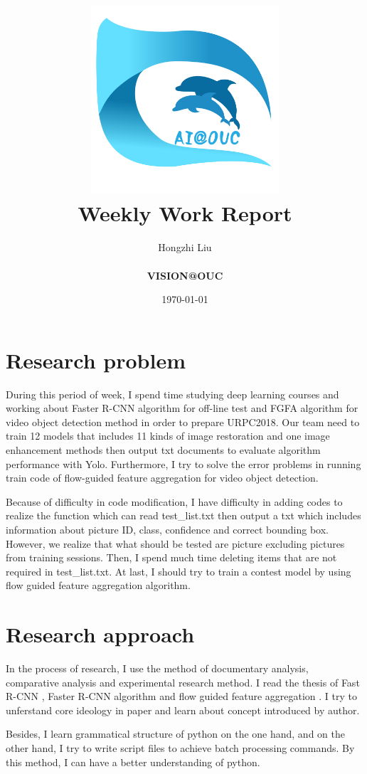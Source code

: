 \documentclass[a4paper]{article}
\title{
    \vspace*{1in}
    \includegraphics[width=2.75in]{figures/zhenglab-logo} \\
    \vspace*{1.2in}
    \textbf{\huge Weekly Work Report}
    \vspace{0.2in}
}
\author{Hongzhi Liu \\
    \vspace*{0.5in} \\
    \textbf{VISION@OUC} \\
    \vspace*{1in}
}
\date{\today}
\begin{document}
\par
\maketitle
\setcounter{page}{0}
\thispagestyle{empty}

\newpage

\section{Research problem}

During this period of week, I spend time studying deep learning courses and working about Faster R-CNN algorithm for off-line test and FGFA algorithm for video object detection method in order to prepare URPC2018. Our team need to train 12 models that includes 11 kinds of image restoration and one image enhancement methods then output txt documents to evaluate algorithm performance with Yolo. Furthermore, I try to solve the error problems in running train code of flow-guided feature aggregation for video object detection.

Because of difficulty in code modification, I have difficulty in adding codes to realize the function which can read test\_list.txt then output a txt which includes information about picture ID, class, confidence and correct bounding box. However, we realize that what should be tested are picture excluding pictures from training sessions. Then, I spend much time deleting items that are not required in test\_list.txt. At last, I should try to train a contest model by using flow guided feature aggregation algorithm. 

\section{Research approach}

In the process of research, I use the method of documentary analysis, comparative analysis and experimental research method. I read the thesis of Fast R-CNN \cite{Girshick2015Fast}, Faster R-CNN algorithm \cite{Ren2015Faster} and flow guided feature aggregation \cite{zhu17fgfa}. I try to unferstand core ideology in paper and learn about concept introduced by author.

Besides, I learn grammatical structure of python on the one hand, and on the other hand, I try to write script files to achieve batch processing commands. By this method, I can have a better understanding of python.
\end{document}
